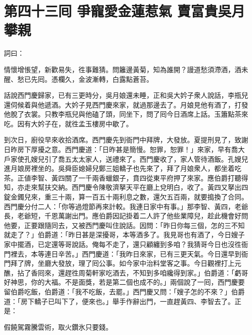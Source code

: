 
\chapter*{第四十三囘 爭寵愛金蓮惹氣 賣富貴吳月攀親}


詞曰：

\begin{myquote}
情懷增悵望，新歡易失，徃事難猜。問籬邊黃菊，知為誰開？謾道愁須滯酒，酒未醒、愁已先囘。憑欄久，金波漸轉，白露點蒼苔。

\end{myquote}

話說西門慶歸家，已有三更時分，吳月娘還未睡，正和吳大妗子衆人說話，李瓶兒還伺候着與他遞酒。大妗子見西門慶來家，就過那邊去了。月娘見他有酒了，打發他脫了衣裳。只教李瓶兒與他磕了頭，同坐下，問了囘今日酒席上話。玉簫點茶來吃。因有大妗子在，就徃孟玉樓房中歇了。

到次日，廚役早來收拾酒席。西門慶先到衙門中拜牌，大發放。夏提刑見了，致謝日昨房下厚擾之意。西門慶道：「日昨甚是簡慢。恕罪，恕罪！」來家，早有喬大戶家使孔嫂兒引了喬五太太家人，送禮來了。西門慶收了，家人管待酒飯。孔嫂兒進月娘房裡坐的。吳舜臣媳婦兒鄭三姐轎子也先來了，拜了月娘衆人，都坐着吃茶。正値李智、黃四關了一千兩香蠟銀子，賁四從東平府押了來家。應伯爵打聽得知，亦走來幫扶交納。西門慶令陳敬濟拏天平在廳上兌明白，收了。黃四又拏出四錠金鐲兒來，重三十兩，算一百五十兩利息之數，還欠五百兩，就要搗換了合同。西門慶分付二人：「你等過燈節再來計較。我連日家中有事。」那李智、黃四，老爺長，老爺短，千恩萬謝出門。應伯爵因記掛着二人許了他些業障兒，趁此機會好問他要，正要跟隨同去，又被西門慶叫住說話。因問：「昨日你每三個，怎的三不知就走了？」伯爵道：「昨日甚是深擾哥，本等酒多了。我見哥也有酒了，今日嫂子家中擺酒，已定還等哥說話。俺每不走了，還只顧纏到多咱？我猜哥今日也沒徃衙門裡去，本等連日辛苦。」西門慶道：「我昨日來家，已有三更天氣。今日還早到衙門拜了牌，坐廳大發放，理了囘公事。如今家中治料堂客之事。今日觀裡打上元醮，拈了香囘來，還趕徃周菊軒家吃酒去，不知到多咱纔得到家。」伯爵道：「虧哥好神思，你的大福。不是面獎，若是第二個也成不的。」{}兩個說了一囘，西門慶要留伯爵吃飯，伯爵道：「我不吃飯，去罷。」西門慶又問：「嫂子怎的不來？」伯爵道：「房下轎子已叫下了，便來也。」舉手作辭出門，一直趕黃四、李智去了。正是：

\begin{myquote}
假饒駕霧騰雲術，取火鑽氷只要錢。
\end{myquote}

